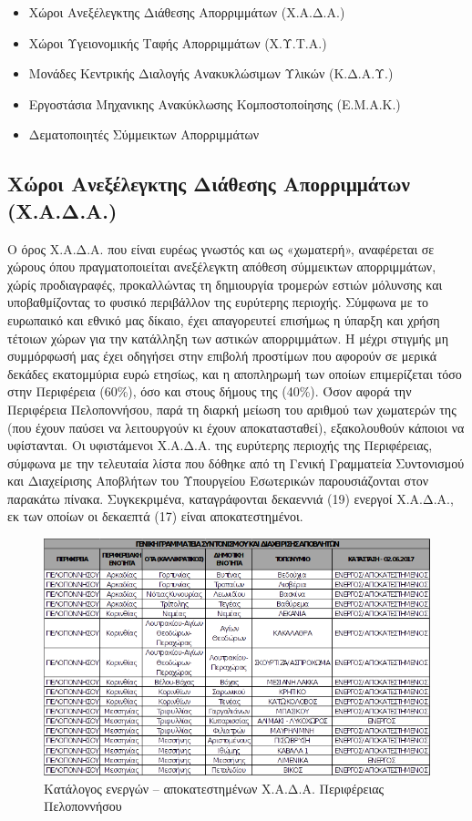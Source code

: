 \documentclass[12pt]{article}
\begin{document}
	\begin{itemize}
		\item Χώροι Ανεξέλεγκτης Διάθεσης Απορριμμάτων (Χ.Α.Δ.Α.)
		\item Χώροι Υγειονομικής Ταφής Απορριμμάτων (Χ.Υ.Τ.Α.)
		\item Μονάδες Κεντρικής Διαλογής Ανακυκλώσιμων Υλικών (Κ.Δ.Α.Υ.)
		\item Εργοστάσια Μηχανικης Ανακύκλωσης Κομποστοποίησης (Ε.Μ.Α.Κ.)
		\item Δεματοποιητές Σύμμεικτων Απορριμμάτων
	\end{itemize}

	\subsection{Χώροι Ανεξέλεγκτης Διάθεσης Απορριμμάτων (Χ.Α.Δ.Α.)}
	
	Ο όρος Χ.Α.Δ.Α. που είναι ευρέως γνωστός και ως «χωματερή», αναφέρεται σε χώρους όπου πραγματοποιείται ανεξέλεγκτη απόθεση σύμμεικτων απορριμμάτων, χώρίς προδιαγραφές, προκαλλώντας τη δημιουργία τρομερών εστιών μόλυνσης και υποβαθμίζοντας το φυσικό περιβάλλον της ευρύτερης περιοχής. Σύμφωνα με το ευρωπαικό και εθνικό μας δίκαιο, έχει απαγορευτεί επισήμως η ύπαρξη και χρήση τέτοιων χώρων για την κατάλληξη των αστικών απορριμμάτων. Η μέχρι στιγμής μη συμμόρφωσή μας έχει οδηγήσει στην επιβολή προστίμων που αφορούν σε μερικά δεκάδες εκατομμύρια ευρώ ετησίως, και η αποπληρωμή των οποίων επιμερίζεται τόσο στην Περιφέρεια (60\%), όσο και στους δήμους της (40\%). Όσον αφορά την Περιφέρεια Πελοποννήσου, παρά τη διαρκή μείωση του αριθμού των χωματερών της (που έχουν παύσει να λειτουργούν κι έχουν αποκατασταθεί), εξακολουθούν κάποιοι να υφίστανται. Οι υφιστάμενοι Χ.Α.Δ.Α. της ευρύτερης περιοχής της Περιφέρειας, σύμφωνα με την τελευταία λίστα που δόθηκε από τη Γενική Γραμματεία Συντονισμού και Διαχείρισης Αποβλήτων του Υπουργείου Εσωτερικών παρουσιάζονται στον παρακάτω πίνακα. Συγκεκριμένα, καταγράφονται δεκαεννιά (19) ενεργοί Χ.Α.Δ.Α., εκ των οποίων οι δεκαεπτά (17) είναι αποκατεστημένοι. 
	
	\begin{figure} [H]
		\begin{center}
			\includegraphics [scale = 0.50] {table11.png}
			\caption{Κατάλογος ενεργών – αποκατεστημένων Χ.Α.Δ.Α. Περιφέρειας Πελοποννήσου}
		\end{center}
	\end{figure}
\end{document}
